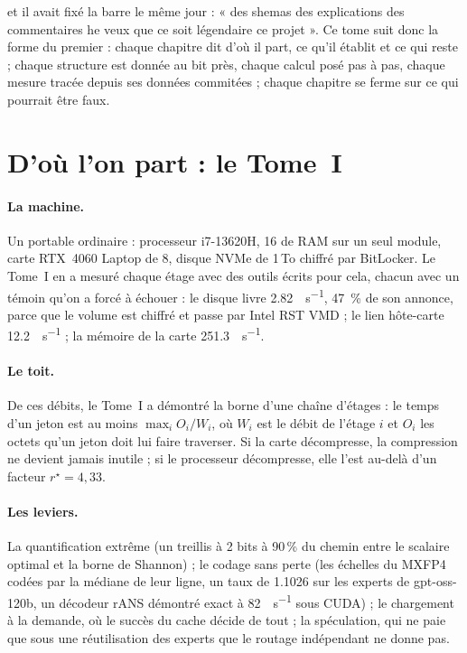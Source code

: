 et il avait fixé la barre le même jour : « des shemas des explications des commentaires he veux que ce soit légendaire ce projet ». Ce tome suit donc la forme du premier : chaque chapitre dit d'où il part, ce qu'il établit et ce qui reste ; chaque structure est donnée au bit près, chaque calcul posé pas à pas, chaque mesure tracée depuis ses données commitées ; chaque chapitre se ferme sur ce qui pourrait être faux.

\section{D'où l'on part : le Tome~I}\label{t2i-sec:tome1}

\paragraph{La machine.} Un portable ordinaire : processeur i7-13620H, \SI{16}{\Go} de RAM sur un seul module, carte RTX~4060 Laptop de \SI{8}{\Go}, disque NVMe de 1\,To chiffré par BitLocker. Le Tome~I en a mesuré chaque étage avec des outils écrits pour cela, chacun avec un témoin qu'on a forcé à échouer : le disque livre \SI{2.82}{\Go\per\second}, \SI{47}{\percent} de son annonce, parce que le volume est chiffré et passe par Intel RST VMD ; le lien hôte-carte \SI{12.2}{\Go\per\second} ; la mémoire de la carte \SI{251.3}{\Go\per\second}.

\paragraph{Le toit.} De ces débits, le Tome~I a démontré la borne d'une chaîne d'étages : le temps d'un jeton est au moins $\max_i O_i / W_i$, où $W_i$ est le débit de l'étage $i$ et $O_i$ les octets qu'un jeton doit lui faire traverser. Si la carte décompresse, la compression ne devient jamais inutile ; si le processeur décompresse, elle l'est au-delà d'un facteur $r^\star = 4{,}33$.

\paragraph{Les leviers.} La quantification extrême (un treillis à 2 bits à \num{90}\,\% du chemin entre le scalaire optimal et la borne de Shannon) ; le codage sans perte (les échelles du MXFP4 codées par la médiane de leur ligne, un taux de \num{1.1026} sur les experts de gpt-oss-120b, un décodeur rANS démontré exact à \SI{82}{\Go\per\second} sous CUDA) ; le chargement à la demande, où le succès du cache décide de tout ; la spéculation, qui ne paie que sous une réutilisation des experts que le routage indépendant ne donne pas.

